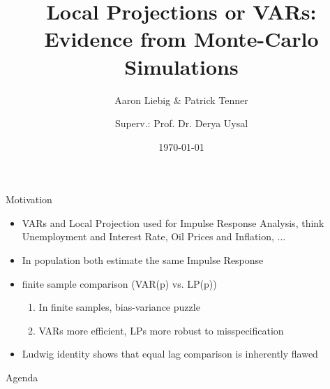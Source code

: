\documentclass[aspectratio=169,xcolor=dvipsnames]{beamer}
\title{Local Projections or VARs: \\ Evidence from Monte-Carlo Simulations}
\subtitle{Aaron Liebig \& Patrick Tenner}
\author{Superv.: Prof. Dr. Derya Uysal}
\institute
{
    SPS Seminar \\
    Summer Semester 26
}
\date{\today} %
\begin{document}
\begin{frame}
    \titlepage
\end{frame}

\begin{frame}{Motivation}
    \begin{itemize}
        \item<1-> VARs and Local Projection used for Impulse Response Analysis, think Unemployment and Interest Rate, Oil Prices and Inflation, ...
        \item<2-> In population both estimate the same Impulse Response
        \item<3-> finite sample comparison (VAR(p) vs. LP(p))
        \begin{enumerate}
            \item<4-> In finite samples, bias-variance puzzle 
            \item<5-> VARs more efficient, LPs more robust to misspecification 
        \end{enumerate}
        
        \item<6-> Ludwig identity shows that equal lag comparison is inherently flawed 
    \end{itemize}


\end{frame}

\begin{frame}{Agenda}
    \tableofcontents
\end{frame}
\end{document}
